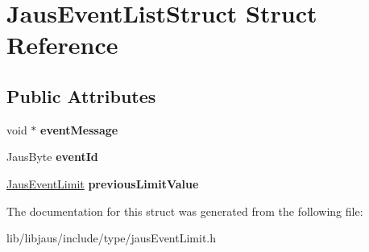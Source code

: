 \hypertarget{struct_jaus_event_list_struct}{\section{\-Jaus\-Event\-List\-Struct \-Struct \-Reference}
\label{struct_jaus_event_list_struct}
}
\subsection*{\-Public \-Attributes}
\begin{DoxyCompactItemize}
\item 
\hypertarget{struct_jaus_event_list_struct_a05e8d8123982812f1d6f10d570d46935}{void $\ast$ {\bfseries event\-Message}}\label{struct_jaus_event_list_struct_a05e8d8123982812f1d6f10d570d46935}

\item 
\hypertarget{struct_jaus_event_list_struct_afa94317d330d1017bfb9faa11b26c266}{\-Jaus\-Byte {\bfseries event\-Id}}\label{struct_jaus_event_list_struct_afa94317d330d1017bfb9faa11b26c266}

\item 
\hypertarget{struct_jaus_event_list_struct_aef80e1c89925253fd11d900553911eaa}{\hyperlink{struct_jaus_event_limit_struct}{\-Jaus\-Event\-Limit} {\bfseries previous\-Limit\-Value}}\label{struct_jaus_event_list_struct_aef80e1c89925253fd11d900553911eaa}

\end{DoxyCompactItemize}


\-The documentation for this struct was generated from the following file\-:\begin{DoxyCompactItemize}
\item 
lib/libjaus/include/type/jaus\-Event\-Limit.\-h\end{DoxyCompactItemize}

